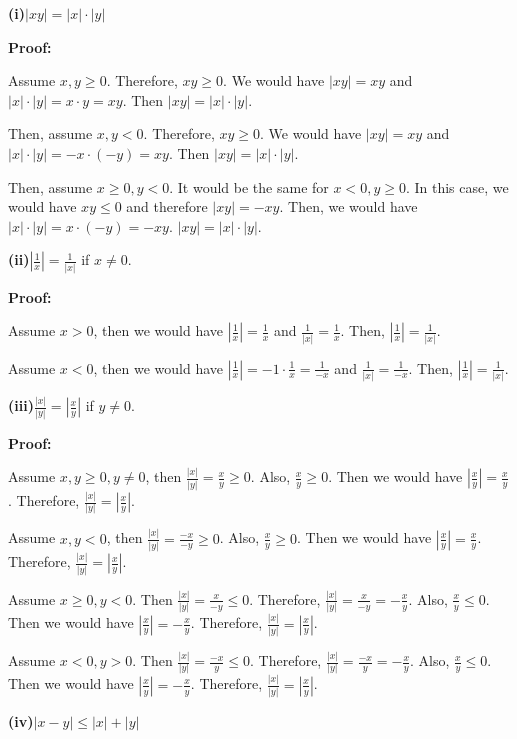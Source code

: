 \documentclass[a4paper,12pt]{report}
\begin{document}
\noindent
\textbf{(i)}$|xy|=|x|\cdot{|y|}$

\noindent
\textbf{Proof: }

\noindent
Assume $x,y \geq 0$. Therefore, $xy \geq 0$. We would have $|xy|=xy$ and $|x|\cdot{|y|}=x\cdot{y} = xy$. Then $|xy|=|x|\cdot{|y|}$.

\noindent
Then, assume $x,y < 0$. Therefore, $xy \geq 0$. We would have $|xy|=xy$ and $|x|\cdot{|y|}=-x\cdot{(-y)} = xy$. Then $|xy|=|x|\cdot{|y|}$.

\noindent
Then, assume $x\geq 0, y<0$. It would be the same for $x<0,y\geq 0$. In this case, we would have $xy \leq 0$ and therefore $|xy|=-xy$. Then, we would have $|x|\cdot{|y|}=x\cdot{(-y)} = -xy$. $|xy|=|x|\cdot{|y|}$.

\noindent
\textbf{(ii)}$|\frac{1}{x}|=\frac{1}{|x|}$ if $x\neq 0$.

\noindent
\textbf{Proof: }

Assume $x> 0$, then we would have $|\frac{1}{x}|=\frac{1}{x}$ and $\frac{1}{|x|}=\frac{1}{x}$. Then,  $|\frac{1}{x}|=\frac{1}{|x|}$. 

Assume $x< 0$, then we would have $|\frac{1}{x}|=-1\cdot{\frac{1}{x}}=\frac{1}{-x}$ and $\frac{1}{|x|}=\frac{1}{-x}$. Then,  $|\frac{1}{x}|=\frac{1}{|x|}$. 

\noindent
\textbf{(iii)}$\frac{|x|}{|y|}=|\frac{x}{y}|$ if $y\neq 0$.

\noindent
\textbf{Proof: }

\noindent
Assume $x, y\geq 0, y\neq 0$, then $\frac{|x|}{|y|}=\frac{x}{y}\geq 0$. Also, $\frac{x}{y}\geq 0$. Then we would have $|\frac{x}{y}|=\frac{x}{y}$. Therefore, $\frac{|x|}{|y|}=|\frac{x}{y}|$.

\noindent
Assume $x,y<0$, then $\frac{|x|}{|y|}=\frac{-x}{-y}\geq 0$. Also, $\frac{x}{y}\geq 0$. Then we would have $|\frac{x}{y}|=\frac{x}{y}$. Therefore, $\frac{|x|}{|y|}=|\frac{x}{y}|$.

\noindent
Assume $x\geq 0, y<0$. Then $\frac{|x|}{|y|}=\frac{x}{-y}\leq 0$. Therefore, $\frac{|x|}{|y|}=\frac{x}{-y}=-\frac{x}{y}$. Also,  $\frac{x}{y}\leq 0$. Then we would have $|\frac{x}{y}|=-\frac{x}{y}$. Therefore, $\frac{|x|}{|y|}=|\frac{x}{y}|$.

\noindent
Assume $x < 0, y>0$. Then $\frac{|x|}{|y|}=\frac{-x}{y}\leq 0$. Therefore, $\frac{|x|}{|y|}=\frac{-x}{y}=-\frac{x}{y}$. Also,  $\frac{x}{y}\leq 0$. Then we would have $|\frac{x}{y}|=-\frac{x}{y}$. Therefore, $\frac{|x|}{|y|}=|\frac{x}{y}|$.

\pagebreak
\noindent
\textbf{(iv)}$|x-y|\leq|x|+|y|$
\end{document}

